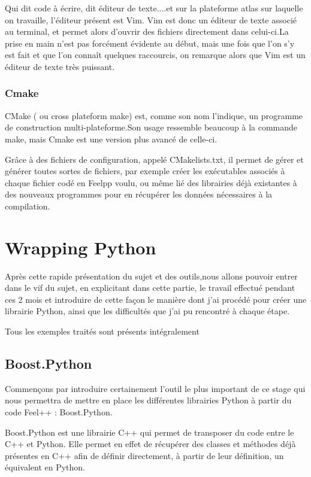 \documentclass[french,12pt]{article}
\begin{document}
Qui dit code à écrire, dit éditeur de texte....et sur la plateforme atlas sur laquelle on travaille, l'éditeur présent est Vim. Vim est donc un éditeur de texte associé au terminal, et permet alors d'ouvrir des fichiers directement dans celui-ci.La prise en main n'est pas forcément évidente au début, mais une fois que l'on s'y est fait et que l'on connaît quelques raccourcis, on remarque alors que Vim est un éditeur de texte très puissant.

\subsubsection{Cmake}

CMake ( ou cross plateform make) est, comme son nom l'indique, un programme de construction multi-plateforme.Son usage ressemble beaucoup à la commande make, mais Cmake est une version plus avancé de celle-ci.
\newline

Grâce à des fichiers de configuration, appelé CMakelists.txt, il permet de gérer et générer toutes sortes de fichiers, par exemple créer les exécutables associés à chaque fichier codé en Feelpp voulu, ou même lié des librairies déjà existantes à des nouveaux programmes pour en récupérer les données nécessaires à la compilation.

\newpage
\section{Wrapping Python}
Après cette rapide présentation du sujet et des outils,nous allons pouvoir entrer dans le vif du sujet, en explicitant dans cette partie, le travail effectué pendant ces 2 mois et introduire de cette façon le manière dont j'ai procédé pour créer une librairie Python, ainsi que les difficultés que j'ai pu rencontré à chaque étape.

Tous les exemples traités sont présents intégralement 
\subsection{Boost.Python}
Commençons par introduire certainement l'outil le plus important de ce stage qui nous permettra de mettre en place les différentes librairies Python à partir du code Feel++ : Boost.Python.
\newline

Boost.Python est une librairie C++ qui permet de transposer du code entre le C++ et Python. Elle permet en effet de récupérer des classes et méthodes déjà présentes en C++ afin de définir directement, à partir de leur définition, un équivalent en Python. 
\newline
\end{document}

